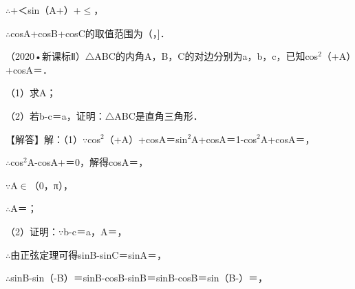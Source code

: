 \begin{question}
\begin{solution}
$\therefore$\allowbreak{}+\allowbreak{}＜sin（A+\allowbreak{}）+\allowbreak{}$\leq$\allowbreak{}，\par
$\therefore$cosA+cosB+cosC的取值范围为（\allowbreak{}，\allowbreak{}]．\par
\end{solution}
\end{question}

\begin{question}
（2020•新课标Ⅱ）$\triangle$ABC的内角A，B，C的对边分别为a，b，c，已知cos$^{2}$（\allowbreak{}+A）+cosA＝\allowbreak{}．\par
（1）求A；\par
（2）若b-c＝\allowbreak{}a，证明：$\triangle$ABC是直角三角形．\par
\begin{solution}
【解答】解：（1）$\because$cos$^{2}$（\allowbreak{}+A）+cosA＝sin$^{2}$A+cosA＝1-cos$^{2}$A+cosA＝\allowbreak{}，\par
$\therefore$cos$^{2}$A-cosA+\allowbreak{}＝0，解得cosA＝\allowbreak{}，\par
$\because$A$\in$（0，π），\par
$\therefore$A＝\allowbreak{}；\par
（2）证明：$\because$b-c＝\allowbreak{}a，A＝\allowbreak{}，\par
$\therefore$由正弦定理可得sinB-sinC＝\allowbreak{}sinA＝\allowbreak{}，\par
$\therefore$sinB-sin（\allowbreak{}-B）＝sinB-\allowbreak{}cosB-\allowbreak{}sinB＝\allowbreak{}sinB-\allowbreak{}cosB＝sin（B-\allowbreak{}）＝\allowbreak{}，\par

\end{solution}
\end{question}
